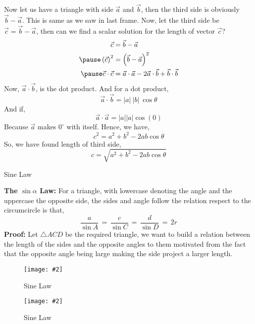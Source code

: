 \documentclass[9pt,serif]{beamer}
\newcommand{\fig}[3]{ \begin{figure} \centering \texttt{[image: \#2]} \caption{#3}  \end{figure}}
\newcommand{\sides}[2]{ \begin{minipage}{0.5\textwidth} #1
    \end{minipage}\hfill%
\begin{minipage}{0.5\textwidth} #2 \end{minipage} }
\begin{document}
\begin{frame}
    Now let us have a triangle with side $\vec a$ and $\vec b$, then the third side is obviously $\vec b - \vec a$. This is same as we saw in last frame. Now, let the third side be $\vec c = \vec b - \vec a$, then can we find a scalar solution for the length of vector $\vec c$?\\
    \begin{align*}
        \vec c &= \vec b - \vec a \\    \pause
        \left(  \vec c \right) ^2 &=  \left( \vec b - \vec a \right) ^2 \\ \pause
        \vec c \cdot \vec c &= \vec a \cdot \vec a -
        2 \vec a \cdot \vec b +
        \vec b \cdot \vec b 
    \end{align*}
    Now, $\vec a \cdot \vec b$, is the dot product. And for a dot product, 
    \[ \vec a \cdot \vec b = |a| \ |b| \ \cos \theta  \] \pause
    And if, 
    \[ \vec a \cdot \vec a = |a| |a | \cos \left( 0 \right)  \] \pause
    Because $\vec a$ makes $0 ^{\circ}$ with itself. Hence, we have, 
    \[ c^2 = a^2 + b^2 - 2ab \cos\theta \]
    So, we have found length of third side,  \[ c=
    \sqrt{a^2 + b^2 - 2ab \cos \theta}  \]
     
\end{frame}


\begin{frame}{Sine Law}
\sides{\begin{small}
\textbf{\textsf{The $\sin \alpha$ Law:}} For a triangle, with lowercase denoting the angle and the uppercase the opposite side, the sides and angle follow the relation respect to the circumcircle is that, 
\[ \frac{a}{\sin A} \,=\, \frac{c}{\sin C} \,=\, \frac{d}{\sin D} \, = \, 2r\]
\textbf{\textsf{Proof:}} Let $\triangle ACD$ be the required triangle, we want to build a relation between the length of the sides and the opposite angles to them motivated from the fact that the opposite angle being large making the side project a larger length.
\end{small}}{
\fig{0.8}{sinelawpic.png}{Sine Law}

}

\end{frame}


\begin{frame}
\fig{0.8}{sinelawpic.png}{Sine Law}
\end{frame}
\end{document}
